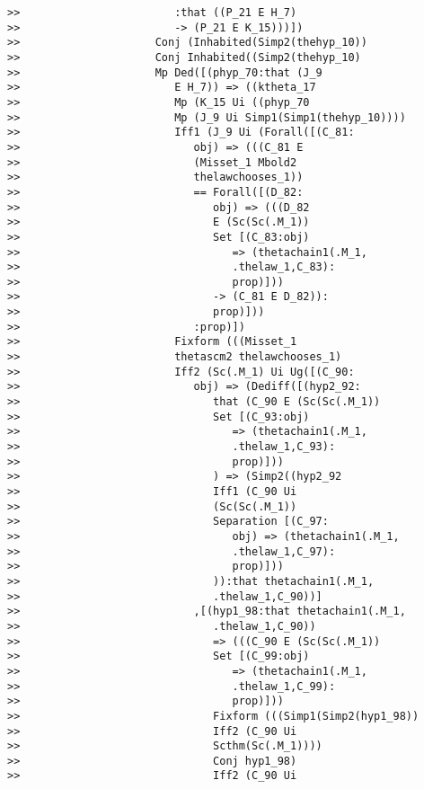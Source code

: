 \documentclass[12pt]{article}
\begin{document}
\begin{verbatim}
>>                        :that ((P_21 E H_7)
>>                        -> (P_21 E K_15)))])
>>                     Conj (Inhabited(Simp2(thehyp_10))
>>                     Conj Inhabited((Simp2(thehyp_10)
>>                     Mp Ded([(phyp_70:that (J_9
>>                        E H_7)) => ((ktheta_17
>>                        Mp (K_15 Ui ((phyp_70
>>                        Mp (J_9 Ui Simp1(Simp1(thehyp_10))))
>>                        Iff1 (J_9 Ui (Forall([(C_81:
>>                           obj) => (((C_81 E
>>                           (Misset_1 Mbold2
>>                           thelawchooses_1))
>>                           == Forall([(D_82:
>>                              obj) => (((D_82
>>                              E (Sc(Sc(.M_1))
>>                              Set [(C_83:obj)
>>                                 => (thetachain1(.M_1,
>>                                 .thelaw_1,C_83):
>>                                 prop)]))
>>                              -> (C_81 E D_82)):
>>                              prop)]))
>>                           :prop)])
>>                        Fixform (((Misset_1
>>                        thetascm2 thelawchooses_1)
>>                        Iff2 (Sc(.M_1) Ui Ug([(C_90:
>>                           obj) => (Dediff([(hyp2_92:
>>                              that (C_90 E (Sc(Sc(.M_1))
>>                              Set [(C_93:obj)
>>                                 => (thetachain1(.M_1,
>>                                 .thelaw_1,C_93):
>>                                 prop)]))
>>                              ) => (Simp2((hyp2_92
>>                              Iff1 (C_90 Ui
>>                              (Sc(Sc(.M_1))
>>                              Separation [(C_97:
>>                                 obj) => (thetachain1(.M_1,
>>                                 .thelaw_1,C_97):
>>                                 prop)]))
>>                              )):that thetachain1(.M_1,
>>                              .thelaw_1,C_90))]
>>                           ,[(hyp1_98:that thetachain1(.M_1,
>>                              .thelaw_1,C_90))
>>                              => (((C_90 E (Sc(Sc(.M_1))
>>                              Set [(C_99:obj)
>>                                 => (thetachain1(.M_1,
>>                                 .thelaw_1,C_99):
>>                                 prop)]))
>>                              Fixform (((Simp1(Simp2(hyp1_98))
>>                              Iff2 (C_90 Ui
>>                              Scthm(Sc(.M_1))))
>>                              Conj hyp1_98)
>>                              Iff2 (C_90 Ui

\end{verbatim}
\end{document}
